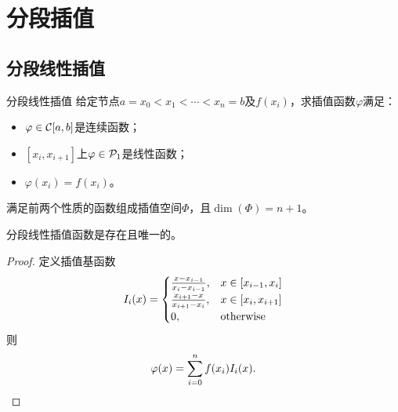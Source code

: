 



\section{分段插值}
\label{sec:piecewise interpolation}

\subsection{分段线性插值}

\begin{definition}
    {分段线性插值}{}
    给定节点$a = x_0 < x_1 < \cdots < x_n = b$及$f(x_i)$，求插值函数$\varphi$满足：
    \begin{itemize}
        \item $\varphi \in \mathcal{C}[a,b]$是连续函数；
        \item $[x_i,x_{i+1}]$上$\varphi \in \mathcal{P}_1$是线性函数；
        \item $\varphi(x_i) = f(x_i)$。
    \end{itemize}
    满足前两个性质的函数组成插值空间$\Phi$，且$\dim(\Phi) = n + 1$。
\end{definition}

\begin{theorem}
    {}{}
    分段线性插值函数是存在且唯一的。
\end{theorem}

\begin{proof}
    定义插值基函数
    \begin{equation}
        I_i(x) = \begin{cases}
            \frac{x - x_{i-1}}{x_i - x_{i-1}},&x \in [x_{i-1},x_i]\\
            \frac{x_{i+1} - x}{x_{i+1} - x_i},&x \in [x_i,x_{i+1}]\\
            0,&\text{otherwise}
        \end{cases}
    \end{equation}
    则
    \begin{equation}
        \varphi(x) = \sum_{i=0}^nf(x_i)I_i(x).
        \qedhere
    \end{equation}
\end{proof}

